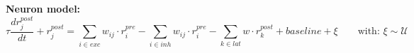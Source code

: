 \textbf{Neuron model:}\\[2pt]
$$
\tau \frac{d r^{post}_j }{ dt } + r^{post}_j = \sum_{i \in exc}{w_{ij} \cdot r^{pre}_i} - \sum_{i \in inh}{w_{ij} \cdot r^{pre}_i} - \sum_{k \in lat}{w \cdot r^{post}_k} + baseline + \xi \hspace{2em} \text{with:  } \xi \sim \mathcal{U}
$$



